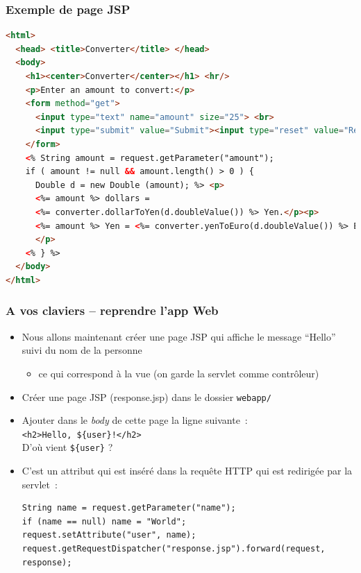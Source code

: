 \documentclass{beamer}
\begin{document}
\begin{frame}[fragile]
  \frametitle{Exemple de page JSP}
  \begin{flushleft}
  \begin{lstlisting}[language=HTML,basicstyle=\tiny]
<html>
  <head> <title>Converter</title> </head>
  <body>
    <h1><center>Converter</center></h1> <hr/>
    <p>Enter an amount to convert:</p>
    <form method="get">
      <input type="text" name="amount" size="25"> <br>
      <input type="submit" value="Submit"><input type="reset" value="Reset">
    </form>
    <% String amount = request.getParameter("amount");
    if ( amount != null && amount.length() > 0 ) {
      Double d = new Double (amount); %> <p>
      <%= amount %> dollars =
      <%= converter.dollarToYen(d.doubleValue()) %> Yen.</p><p>
      <%= amount %> Yen = <%= converter.yenToEuro(d.doubleValue()) %> Euro.
      </p>
    <% } %>
  </body>
</html>
\end{lstlisting}
  \end{flushleft}  
\end{frame}

\begin{frame}[fragile]
	\frametitle{A vos claviers -- reprendre l'app Web}
	\begin{itemize}
		\item Nous allons maintenant créer une page JSP qui affiche le message ``Hello'' suivi du nom de la personne
		\begin{itemize}
			\item ce qui correspond à la vue (on garde la servlet comme contrôleur)
		\end{itemize}
	\item Créer une page JSP (response.jsp) dans le dossier \texttt{webapp/}
	\item Ajouter dans le \textit{body} de cette page la ligne suivante~:\\
	\texttt{<h2>Hello, \$\{user\}!</h2>}\\
	D'où vient \texttt{\$\{user\}} ?
	\item C'est un attribut qui est inséré dans la requête HTTP qui est redirigée par la servlet~:
\begin{lstlisting}
String name = request.getParameter("name");
if (name == null) name = "World";
request.setAttribute("user", name);
request.getRequestDispatcher("response.jsp").forward(request, response);	
\end{lstlisting}
	\end{itemize}
\end{frame}
\end{document}
